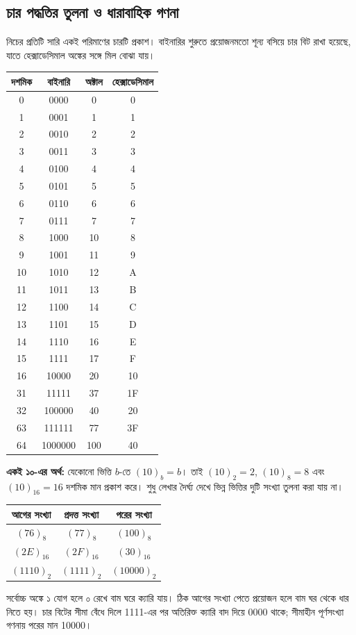 \subsection{চার পদ্ধতির তুলনা ও ধারাবাহিক গণনা}
নিচের প্রতিটি সারি একই পরিমাণের চারটি প্রকাশ। বাইনারির শুরুতে প্রয়োজনমতো শূন্য বসিয়ে চার বিট রাখা হয়েছে, যাতে হেক্সাডেসিমাল অঙ্কের সঙ্গে মিল বোঝা যায়।
\begin{center}\begin{tabular}{|c|c|c|c|}\hline
\rowcolor{ICTLightBlue}দশমিক&বাইনারি&অক্টাল&হেক্সাডেসিমাল\\\hline
0&0000&0&0\\\hline
1&0001&1&1\\\hline
2&0010&2&2\\\hline
3&0011&3&3\\\hline
4&0100&4&4\\\hline
5&0101&5&5\\\hline
6&0110&6&6\\\hline
7&0111&7&7\\\hline
8&1000&10&8\\\hline
9&1001&11&9\\\hline
10&1010&12&A\\\hline
11&1011&13&B\\\hline
12&1100&14&C\\\hline
13&1101&15&D\\\hline
14&1110&16&E\\\hline
15&1111&17&F\\\hline
16&10000&20&10\\\hline
31&11111&37&1F\\\hline
32&100000&40&20\\\hline
63&111111&77&3F\\\hline
64&1000000&100&40\\\hline
\end{tabular}\end{center}
\textbf{একই ১০-এর অর্থ:} যেকোনো ভিত্তি $b$-তে $(10)_b=b$। তাই $(10)_2=2$, $(10)_8=8$ এবং $(10)_{16}=16$ দশমিক মান প্রকাশ করে। শুধু লেখার দৈর্ঘ্য দেখে ভিন্ন ভিত্তির দুটি সংখ্যা তুলনা করা যায় না।

\begin{center}\begin{tabular}{|c|c|c|}\hline
আগের সংখ্যা&প্রদত্ত সংখ্যা&পরের সংখ্যা\\\hline
$(76)_8$&$(77)_8$&$(100)_8$\\\hline
$(2E)_{16}$&$(2F)_{16}$&$(30)_{16}$\\\hline
$(1110)_2$&$(1111)_2$&$(10000)_2$\\\hline
\end{tabular}\end{center}
সর্বোচ্চ অঙ্কে ১ যোগ হলে ০ রেখে বাম ঘরে ক্যারি যায়। ঠিক আগের সংখ্যা পেতে প্রয়োজন হলে বাম ঘর থেকে ধার নিতে হয়। চার বিটের সীমা বেঁধে দিলে 1111-এর পর অতিরিক্ত ক্যারি বাদ দিয়ে 0000 থাকে; সীমাহীন পূর্ণসংখ্যা গণনায় পরের মান 10000।

